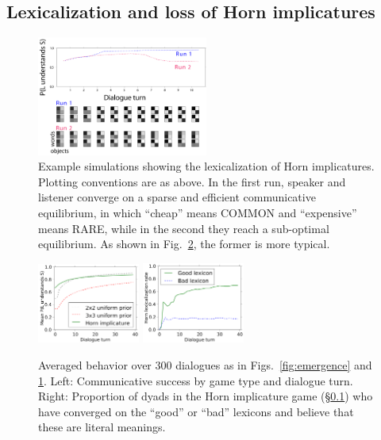 \documentclass{article} %
\begin{document}
\subsection{Lexicalization and loss of Horn implicatures}
\label{sec:horn-emergence}


\begin{figure}
\centering
\includegraphics[width=0.5\textwidth]{figures/horn-composite.pdf}
\caption{\label{fig:horn} Example simulations showing the
  lexicalization of Horn implicatures. Plotting conventions are as
  above. In the first run, speaker and listener converge on a sparse
  and  efficient communicative equilibrium, in which ``cheap'' means
  \textsc{COMMON} and ``expensive'' means \textsc{RARE}, while in the
  second they reach a sub-optimal equilibrium. As shown in
  Fig.~\ref{fig:emergence-average}, the former is more typical.}
\end{figure}



\begin{figure}
\centering
\includegraphics[width=0.3\textwidth]{figures/emergence-average.pdf}
\hspace{0.2in}
\includegraphics[width=0.3\textwidth]{figures/emergence-horn-average.pdf}
\caption{\label{fig:emergence-average} Averaged behavior over 300
  dialogues as in Figs.~\ref{fig:emergence} and \ref{fig:horn}. Left:
  Communicative success by game type and dialogue turn. Right:
  Proportion of dyads in the Horn implicature game
  (\S\ref{sec:horn-emergence}) who have converged on the ``good'' or
  ``bad'' lexicons and believe that these are literal meanings.}
\end{figure}
\end{document}
